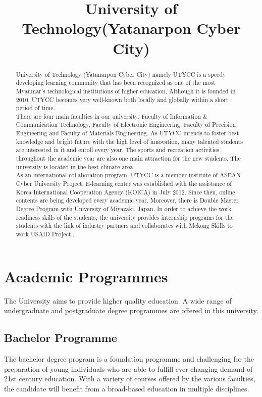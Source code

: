 \documentclass[conference]{IEEEtran}
\begin{document}
\title{University of Technology(Yatanarpon Cyber City)}

\author{
}

\maketitle

\begin{abstract}
University of Technology (Yatanarpon Cyber City) namely UTYCC is a speedy developing learning community that has been recognized as one of the most Myanmar’s technological institutions of higher education. Although it is founded in 2010, UTYCC becomes very well-known both locally and globally within a short period of time.\\
There are four main faculties in our university: Faculty of Information \& Communication Technology, Faculty of Electronic Engineering, Faculty of Precision Engineering and Faculty of Materials Engineering. As UTYCC intends to foster best knowledge and bright future with the high level of innovation, many talented students are interested in it and enroll every year. The sports and recreation activities throughout the academic year are also one main attraction for the new students. The university is located in the best climate area.\\
As an international collaboration program, UTYCC is a member institute of ASEAN Cyber University Project. E-learning center was established with the assistance of Korea International Cooperation Agency (KOICA) in July 2012. Since then, online contents are being developed every academic year. Moreover, there is Double Master Degree Program with University of Miyazaki, Japan. In order to achieve the work readiness skills of the students, the university provides internship programs for the students with the link of industry partners and collaborates with Mekong Skills to work USAID Project..
\end{abstract}

\section{Academic Programmes}
The University aims to provide higher quality education. A wide range of undergraduate and postgraduate degree programmes are offered in this university.
\subsection{Bachelor Programme}
The bachelor degree program is a foundation programme and challenging for the preparation of young individuals who are able to fulfill ever-changing demand of 21st century education. With a variety of courses offered by the various faculties, the candidate will benefit from a broad-based education in multiple disciplines.
\end{document}
